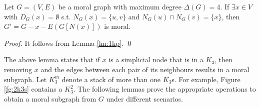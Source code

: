 \begin{lemma}
\label{lm:1k3}
Let $G=(V,E)$ be a moral graph with maximum degree $\Delta(G)=4$. If $\exists x \in V$ with $D_G(x)=\emptyset$ s.t. $N_G(x)=\{u,v\}$ and $N_G(u)\cap N_G(v)=\{x\}$, then $G'=G-x-E(G[N(x)])$ is moral.
\end{lemma}
\begin{proof}
It follows from Lemma \ref{lm:1kp}. \qed
\end{proof}
The above lemma states that if $x$ is a simplicial node that is in a $K_3$, then removing $x$ and the edges between each pair of its neighbours results in a moral subgraph. Let $K_3^m$ denote a stack of more than one $K_3$s. For example, Figure \ref{fg:2k3s} contains a $K_3^2$. The following lemmas prove the appropriate operations to obtain a moral subgraph from $G$ under different scenarios. 

